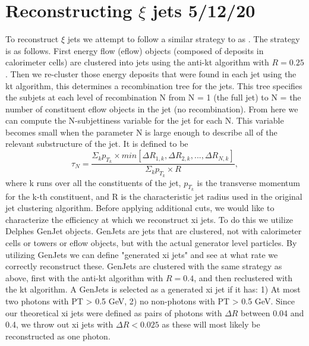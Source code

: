 \documentclass[aps,onecolumn,twoside,secnumarabic,balancelastpage,amsmath,amssymb,nofootinbib,hyperref=pdftex]{revtex4}
\begin{document}
\section{Reconstructing $\xi$ jets \tiny{5/12/20}}
To reconstruct $\xi$ jets we attempt to follow a similar strategy to as \cite{Ellis:2012zp}. The strategy is as follows. First energy flow (eflow) objects (composed of deposits in calorimeter cells) are clustered into jets using the anti-kt algorithm with $R = 0.25$. Then we re-cluster those energy deposits that were found in each jet using the kt algorithm, this determines a recombination tree for the jets. This tree specifies the subjets at each level of recombination N from N = 1 (the full jet) to N = the number of constituent eflow objects in the jet (no recombination). From here we can compute the N-subjettiness variable for the jet for each N. This variable becomes small when the parameter N is large enough to describe all of the relevant substructure of the jet. It is defined to be
\begin{equation}
\tau_{N} = \frac{\Sigma_{k} p_{T_{k}} \times min[\Delta R_{1,k},\Delta R_{2,k}, . . . , \Delta R_{N,k}]}{\Sigma_{k}p_{T_{k}} \times R},
\end{equation}
where k runs over all the constituents of the jet, $p_{T_{k}}$ is the transverse momentum for the k-th constituent, and R is the characteristic jet radius used in the original jet clustering algorithm. 
\vskip 0.12in
Before applying additional cuts, we would like to characterize the efficiency at which we reconstruct xi jets. To do this we utilize Delphes GenJet objects. GenJets are jets that are clustered, not with calorimeter cells or towers or eflow objects, but with the actual generator level particles. By utilizing GenJets we can define "generated xi jets" and see at what rate we correctly reconstruct these.
\vskip 0.12in
GenJets are clustered with the same strategy as above, first with the anti-kt algorithm with $R = 0.4$, and then reclustered with the kt algorithm. A GenJets is selected as a generated xi jet if it has: 1) At most two photons with PT > 0.5 GeV, 2) no non-photons with PT > 0.5 GeV. Since our theoretical xi jets were defined as pairs of photons with $\Delta R$ between 0.04 and 0.4, we throw out xi jets with $\Delta R < 0.025$ as these will most likely be reconstructed as one photon. 
\end{document}
